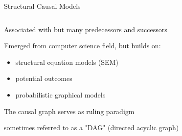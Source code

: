 \documentclass[notes,11pt, aspectratio=169, usenames, dvipsnames]{beamer}
\newenvironment{wideitemize}{\itemize\addtolength{\itemsep}{10pt}}{\enditemize}
\begin{document}
\begin{frame}{Structural Causal Models}
	\begin{columns}[c]
		\begin{column}{0.58\textwidth}
			\begin{wideitemize}
				\item Associated with \citet{Pearl2000} but many predecessors and successors
				\item Emerged from computer science field, but builds on:
				\begin{itemize}
					\item structural equation models (SEM) \citep{Goldberger1973}
					\item potential outcomes
					\item probabilistic graphical models \citep{Lauritzen1996, SpirtesEtal2000}
				\end{itemize}
				\item The causal graph serves as ruling paradigm
				\item sometimes referred to as a "DAG" (directed acyclic graph)
			\end{wideitemize}
		\end{column}
		\hfill%
		\begin{column}{0.4\textwidth}
\end{column}
\end{columns}
\end{frame}
\end{document}
